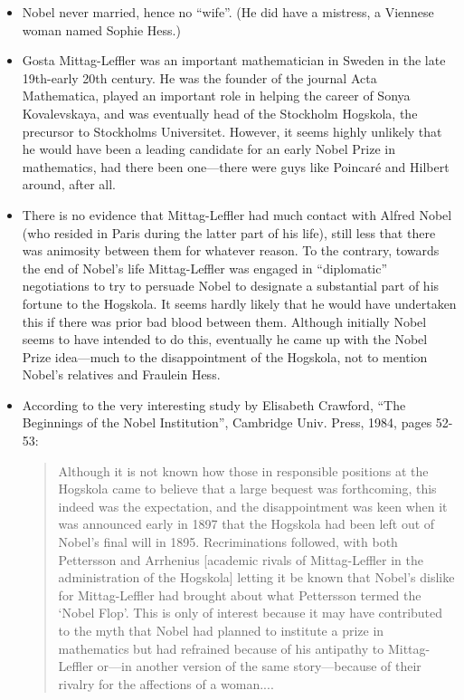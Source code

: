 \begin{itemize}
  \item  Nobel never married, hence no ``wife''. (He did have a mistress,
    a Viennese woman named Sophie Hess.)
    \item  Gosta Mittag-Leffler was an important mathematician in Sweden
    in the late 19th-early 20th century.  He was the founder of the
    journal Acta Mathematica, played an important role in helping the
    career of Sonya Kovalevskaya, and was eventually head of the
    Stockholm Hogskola, the precursor to Stockholms Universitet.
    However, it seems highly unlikely that he would have been a
    leading candidate for an early Nobel Prize in mathematics, had
    there been one---there were guys like Poincar\'e and Hilbert around,
    after all.
    \item  There is no evidence that Mittag-Leffler had much contact with
    Alfred Nobel (who resided in Paris during the latter part of his
    life), still less that there was animosity between them for whatever
    reason.  To the contrary, towards the end of Nobel's life
    Mittag-Leffler was engaged in ``diplomatic'' negotiations to try to
    persuade Nobel to designate a substantial part of his fortune to the
    Hogskola. It seems hardly likely that he would have undertaken this
    if there was prior bad blood between them.  Although initially Nobel
    seems to have intended to do this, eventually he came up with the
    Nobel Prize idea---much to the disappointment of the Hogskola,
    not to mention Nobel's relatives and Fraulein Hess.
    \item According to the very interesting study by Elisabeth Crawford,
    ``The Beginnings of the Nobel Institution'', Cambridge Univ. Press,
    1984, pages 52-53:
\begin{quote}
    Although it is not known how those in responsible positions
    at the Hogskola came to believe that a large bequest was forthcoming,
    this indeed was the expectation, and the disappointment was keen when
    it was announced early in 1897 that the Hogskola had been left out of
    Nobel's final will in 1895.  Recriminations followed, with both
    Pettersson and Arrhenius [academic rivals of Mittag-Leffler in the
    administration of the Hogskola] letting it be known that Nobel's
    dislike for Mittag-Leffler had brought about what Pettersson termed the
    `Nobel Flop'.  This is only of interest because it may have contributed
    to the myth that Nobel had planned to institute a prize in mathematics
    but had refrained because of his antipathy to Mittag-Leffler or---in
    another version of the same story---because of their rivalry for
    the affections of a woman....
\end{quote}



\end{itemize}
